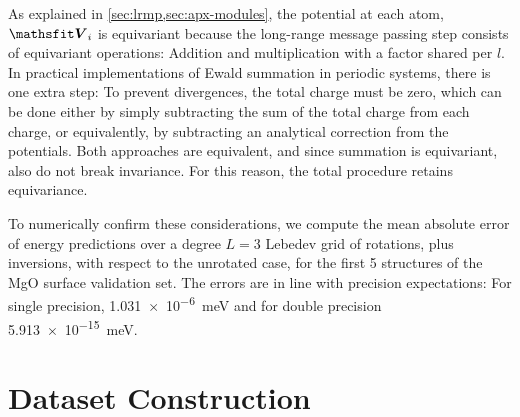 \documentclass[10pt]{article} %
\begin{document}
As explained in \cref{sec:lrmp,sec:apx-modules}, the potential at each atom, $\tV_i$ is equivariant because the long-range message passing step consists of equivariant operations: Addition and multiplication with a factor shared per $l$. In practical implementations of Ewald summation in periodic systems, there is one extra step: To prevent divergences, the total charge must be zero, which can be done either by simply subtracting the sum of the total charge from each charge, or equivalently, by subtracting an analytical correction from the potentials. Both approaches are equivalent, and since summation is equivariant, also do not break invariance. For this reason, the total procedure retains equivariance.

To numerically confirm these considerations, we compute the mean absolute error of energy predictions over a degree $L=3$ Lebedev grid of rotations, plus inversions, with respect to the unrotated case, for the first \num{5} structures of the MgO surface validation set. The errors are in line with precision expectations: For single precision, \qty{1.031e-6}{meV} and for double precision \qty{5.913e-15}{meV}.


\section{Dataset Construction}
\label{sec:ap_datasets}
\end{document}
